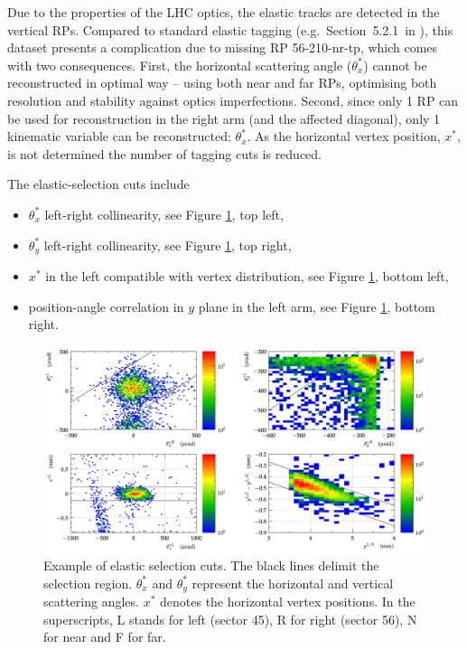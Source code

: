 \documentclass[TOTEM]{cern/cernphprep}
\begin{document}
Due to the properties of the LHC optics, the elastic tracks are detected in the vertical RPs. Compared to standard elastic tagging (e.g.~Section~5.2.1~in \cite{totem-8tev-90m}), this dataset presents a complication due to missing RP 56-210-nr-tp, which comes with two consequences. First, the horizontal scattering angle ($\theta_x^*$) cannot be reconstructed in optimal way -- using both near and far RPs, optimising both resolution and stability against optics imperfections. Second, since only 1 RP can be used for reconstruction in the right arm (and the affected diagonal), only 1 kinematic variable can be reconstructed: $\theta_x^*$. As the horizontal vertex position, $x^*$, is not determined the number of tagging cuts is reduced.

The elastic-selection cuts include
\begin{itemize}[noitemsep]
\item $\theta_x^*$ left-right collinearity, see Figure \ref{fig:el_cuts}, top left,
\item $\theta_y^*$ left-right collinearity, see Figure \ref{fig:el_cuts}, top right,
\item $x^*$ in the left compatible with vertex distribution, see Figure \ref{fig:el_cuts}, bottom left,
\item position-angle correlation in $y$ plane in the left arm, see Figure \ref{fig:el_cuts}, bottom right.
\end{itemize}

\begin{figure}[h!]
\begin{center}
\includegraphics[width=1\hsize]{fig/calibration_fill/el_cut_example.pdf}
\caption{%
Example of elastic selection cuts. The black lines delimit the selection region. $\theta_x^*$ and $\theta_y^*$ represent the horizontal and vertical scattering angles. $x^*$ denotes the horizontal vertex positions. In the superscripts, L stands for left (sector 45), R for right (sector 56), N for near and F for far.
}
\label{fig:el_cuts}
\end{center}
\end{figure}
\end{document}
